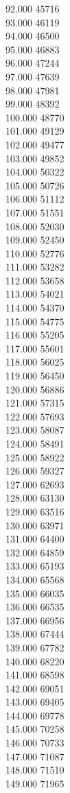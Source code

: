 { 92.000	45716 \\
 93.000	46119 \\
 94.000	46500 \\
 95.000	46883 \\
 96.000	47244 \\
 97.000	47639 \\
 98.000	47981 \\
 99.000	48392 \\
 100.000	48770 \\
 101.000	49129 \\
 102.000	49477 \\
 103.000	49852 \\
 104.000	50322 \\
 105.000	50726 \\
 106.000	51112 \\
 107.000	51551 \\
 108.000	52030 \\
 109.000	52450 \\
 110.000	52776 \\
 111.000	53282 \\
 112.000	53658 \\
 113.000	54021 \\
 114.000	54370 \\
 115.000	54775 \\
 116.000	55205 \\
 117.000	55601 \\
 118.000	56025 \\
 119.000	56450 \\
 120.000	56886 \\
 121.000	57315 \\
 122.000	57693 \\
 123.000	58087 \\
 124.000	58491 \\
 125.000	58922 \\
 126.000	59327 \\
 127.000	62693 \\
 128.000	63130 \\
 129.000	63516 \\
 130.000	63971 \\
 131.000	64400 \\
 132.000	64859 \\
 133.000	65193 \\
 134.000	65568 \\
 135.000	66035 \\
 136.000	66535 \\
 137.000	66956 \\
 138.000	67444 \\
 139.000	67782 \\
 140.000	68220 \\
 141.000	68598 \\
 142.000	69051 \\
 143.000	69405 \\
 144.000	69778 \\
 145.000	70258 \\
 146.000	70733 \\
 147.000	71087 \\
 148.000	71510 \\
 149.000	71965 \\
}
